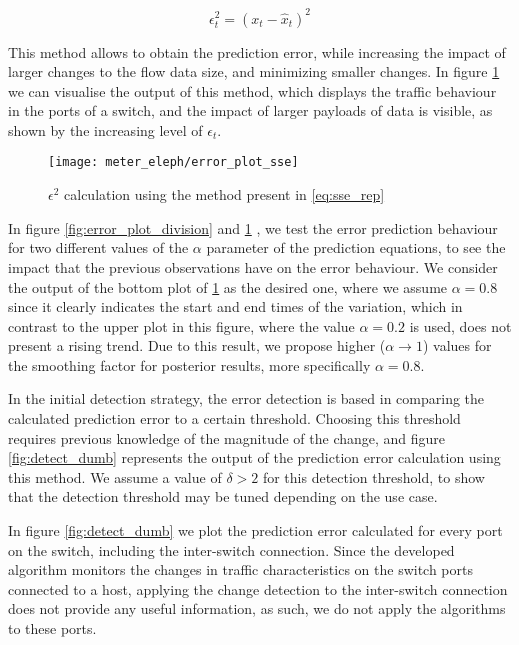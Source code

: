 \begin {equation} 
    \label{eq:sse_rep}
    \epsilon_t^2 = (x_t-\hat{x}_{t})^2 
\end {equation}

This method allows to obtain the prediction error, while increasing the impact of larger changes to the flow data size, and minimizing smaller changes. In figure
\ref{fig:error_plot_sse} we can visualise the output of this method, which displays the traffic behaviour in the ports of a switch, and the impact of larger payloads
of data is visible, as shown by the increasing level of $\epsilon_t$.

\begin{figure}[H]
    \centering
    \label{fig:error_sse}
    \texttt{[image: meter\_eleph/error\_plot\_sse]}
    \caption{$\epsilon^2$ calculation using the method present in \ref{eq:sse_rep}}
    \label{fig:error_plot_sse}
\end{figure}

\par In figure \ref{fig:error_plot_division} and \ref{fig:error_plot_sse} , we test the error prediction behaviour for two different values of the $\alpha$ parameter
of the prediction equations, to see the impact that the previous observations have on the error behaviour. We consider the output of the bottom plot of 
\ref{fig:error_plot_sse} as the desired one, where we assume $\alpha = 0.8$ since it clearly indicates the start and end times of the variation, which in contrast 
to the upper plot in this figure, where the value $\alpha = 0.2$ is used, does not present a rising trend. Due to this result, we propose higher ($\alpha \rightarrow 
1$) values for the smoothing factor for posterior results, more specifically $\alpha = 0.8$.

\par In the initial detection strategy, the error detection is based in comparing the calculated prediction error to a certain threshold. Choosing this threshold 
requires previous knowledge of the magnitude of the change, and figure \ref{fig:detect_dumb} represents the output of the prediction error calculation using this
method. We assume a value of $\delta > 2$ for this detection threshold, to show that the detection threshold may be tuned depending on the use case.

\par In figure \ref{fig:detect_dumb} we plot the prediction error calculated for every port on the switch, including the inter-switch connection. Since the developed
algorithm monitors the changes in traffic characteristics on the switch ports connected to a host, applying the change detection to the inter-switch connection
does not provide any useful information, as such, we do not apply the algorithms to these ports.

